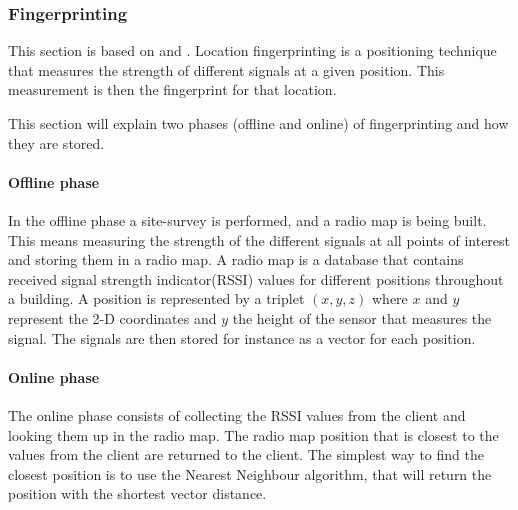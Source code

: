 \subsubsection{Fingerprinting}\label{fingerprinting}
This section is based on \citet{fingerprinting_slides} and \citet{fingerprinting}.
Location fingerprinting is a positioning technique that measures the strength of different signals at a given position.
This measurement is then the fingerprint for that location.

This section will explain two phases (offline and online) of fingerprinting and how they are stored.
\paragraph{Offline phase}
In the offline phase a site-survey is performed, and a radio map is being built.
This means measuring the strength of the different signals at all points of interest and storing them in a radio map.
A radio map is a database that contains received signal strength indicator(RSSI) values for different positions throughout a building.
A position is represented by a triplet $(x,y,z)$ where $x$ and $y$ represent the 2-D coordinates and $y$ the height of the sensor that measures the signal.
The signals are then stored for instance as a vector for each position.

\paragraph{Online phase}
The online phase consists of collecting the RSSI values from the client and looking them up in the radio map.
The radio map position that is closest to the values from the client are returned to the client.
The simplest way to find the closest position is to use the Nearest Neighbour algorithm, that will return the position with the shortest vector distance.
